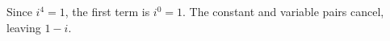 Since $i^4=1$, the first term is $i^0=1$. The constant and variable pairs cancel, leaving $\boxed{1-i}$.
